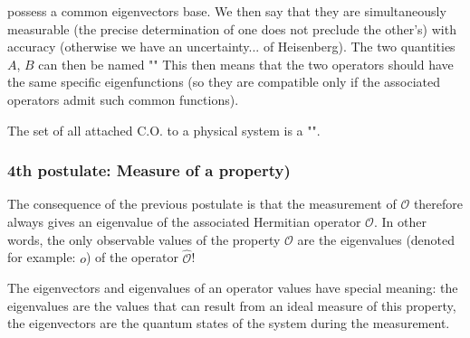 	possess a common eigenvectors base. We then say that they are simultaneously measurable (the precise determination of one does not preclude the other's) with accuracy (otherwise we have an uncertainty... of Heisenberg). The two quantities $A$, $B$ can then be named "" This then means that the two operators should have the same specific eigenfunctions (so they are compatible only if the associated operators admit such common functions).
	
	The set of all attached C.O. to a physical system is a "".
	
	\subsubsection{4th postulate: Measure of a property)}	
	The consequence of the previous postulate is that the measurement of $\mathcal{O}$ therefore always gives an eigenvalue of the associated Hermitian operator $\hat{\mathcal{O}}$. In other words, the only observable values of the property $\mathcal{O}$ are the eigenvalues (denoted for example: $o$) of the operator $\hat{\mathcal{O}}$!
	
	
	The eigenvectors and eigenvalues of an operator values have special meaning: the eigenvalues are the values that can result from an ideal measure of this property, the eigenvectors are the quantum states of the system during the measurement.
	
